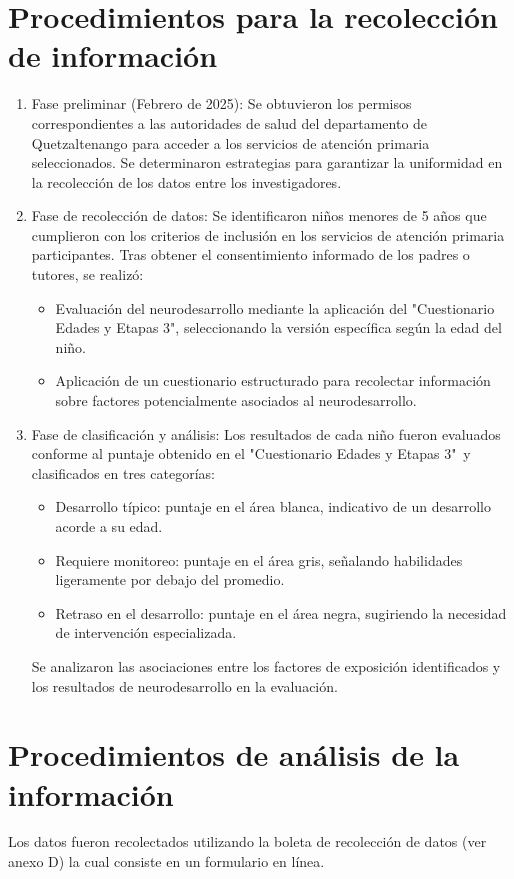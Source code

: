 \documentclass[11pt,letterpaper]{report}
\newcommand{\asq}{"Cuestionario Edades y Etapas 3"}
\begin{document}
\section{Procedimientos para la recolección de información}
	\begin{enumerate}
		\item Fase preliminar (Febrero de 2025):
		Se obtuvieron los permisos correspondientes a las autoridades de salud
		del departamento de Quetzaltenango para acceder a los servicios de
		atención primaria seleccionados. Se determinaron estrategias para
		garantizar la uniformidad en la recolección de los datos entre los
		investigadores.
		\item Fase de recolección de datos:
		Se identificaron niños menores de 5 años que cumplieron con los
		criterios de inclusión en los servicios de atención primaria
		participantes. Tras obtener el consentimiento informado de los padres o
		tutores, se realizó:
			\begin{itemize}
			\item Evaluación del neurodesarrollo mediante la aplicación del
			\asq, seleccionando la versión específica según la edad del niño.
			\item Aplicación de un cuestionario estructurado para recolectar
			información sobre factores potencialmente asociados al
			neurodesarrollo.
			\end{itemize}
		\item Fase de clasificación y análisis:
		Los resultados de cada niño fueron evaluados conforme al puntaje
		obtenido en el \asq\ y clasificados en tres categorías:
			\begin{itemize}
			\item Desarrollo típico: puntaje en el área blanca, indicativo de
			un desarrollo acorde a su edad.
			\item Requiere monitoreo: puntaje en el área gris, señalando
			habilidades ligeramente por debajo del promedio.
			\item Retraso en el desarrollo: puntaje en el área negra,
			sugiriendo la necesidad de intervención especializada.
			\end{itemize}
		Se analizaron las asociaciones entre los factores de exposición
		identificados y los resultados de neurodesarrollo en la evaluación.
	\end{enumerate}

\section{Procedimientos de análisis de la información}
Los datos fueron recolectados utilizando la boleta de recolección de datos (ver
anexo D) la cual consiste en un formulario en línea.
\end{document}
